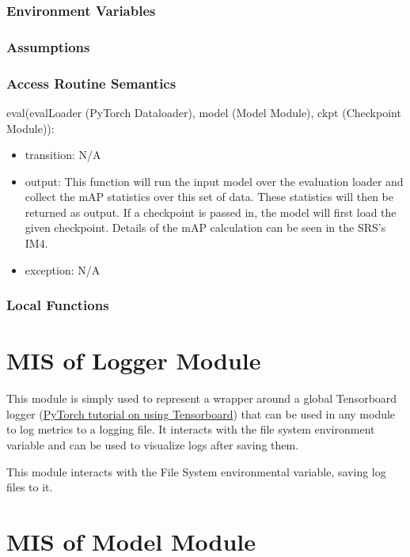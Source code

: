 \documentclass[12pt, titlepage]{article}
\begin{document}
\subsubsection{Environment Variables}


\subsubsection{Assumptions}

\subsubsection{Access Routine Semantics}
\noindent eval(evalLoader (PyTorch Dataloader), model (Model Module), ckpt (Checkpoint Module)):
\begin{itemize}
\item transition: N/A 
\item output: This function will run the input model over the evaluation loader and collect the mAP statistics over this set of data. These statistics will then be returned as output. If a checkpoint is passed in, the model will first load the given checkpoint. Details of the mAP calculation can be seen in the SRS's IM4.
\item exception: N/A
\end{itemize}

\subsubsection{Local Functions}


\newpage

\section{MIS of Logger Module} \label{ModuleLog} 
This module is simply used to represent a wrapper around a global Tensorboard logger (\href{https://pytorch.org/tutorials/recipes/recipes/tensorboard_with_pytorch.html}{PyTorch tutorial on using Tensorboard})
that can be used in any module to log metrics to a logging file. It interacts with the file system environment variable and can be used to visualize logs after saving them.

This module interacts with the File System environmental variable, saving log files to it.
\newpage

\section{MIS of Model Module} \label{ModuleModel} 
\end{document}
